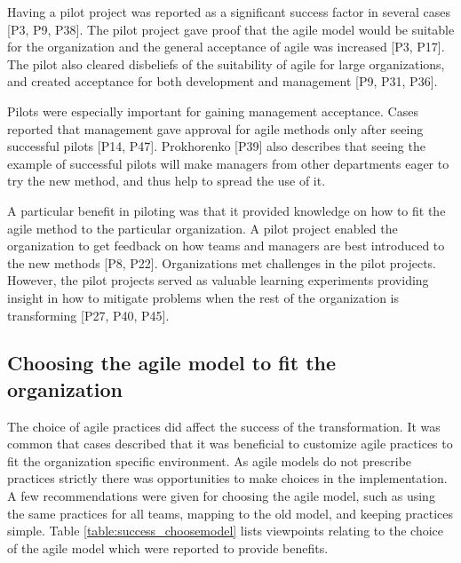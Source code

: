 
Having a pilot project was reported as a significant success factor in several
cases [P3, P9, P38].
The pilot project gave proof that the agile model would be suitable for the
organization and the general acceptance of agile was increased [P3, P17].
The pilot also cleared disbeliefs of the suitability of agile for large
organizations, and created acceptance for both development and management [P9,
P31, P36].

Pilots were especially important for gaining management acceptance. Cases
reported that management gave approval for agile methods only after seeing
successful pilots [P14, P47]. Prokhorenko [P39] also describes that seeing the
example of successful pilots will make managers from other departments eager to
try the new method, and thus help to spread the use of it.


A particular benefit in piloting was that it provided knowledge on how to fit
the agile method to the particular organization.
A pilot project enabled the organization to get feedback on how teams and
managers are best introduced to the new methods [P8, P22].
Organizations met challenges in the pilot projects. However, the pilot projects
served as valuable learning experiments providing insight in how to mitigate
problems when the rest of the organization is transforming [P27, P40, P45].


\subsection{Choosing the agile model to fit the organization}

The choice of agile practices did affect the success of the transformation. It
was common that cases described that it was beneficial to customize agile
practices to fit the organization specific environment. As agile models do not
prescribe practices strictly there was opportunities to make choices in the
implementation. A few recommendations were given for choosing the agile model,
such as using the same practices for all teams, mapping to the old model, and
keeping practices simple. Table \ref{table:success_choosemodel} lists viewpoints
relating to the choice of the agile model which were reported to provide
benefits.

